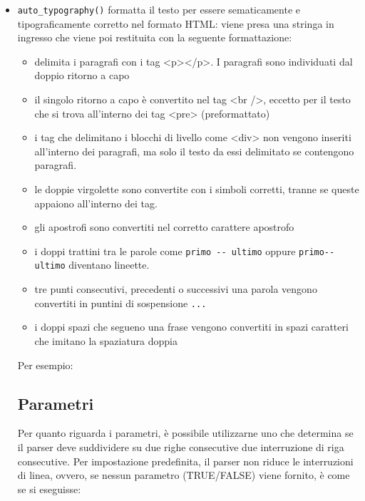 \begin{itemize}
\item \verb|auto_typography()| formatta il testo per essere sematicamente e tipograficamente corretto nel formato HTML: viene presa una stringa in ingresso che viene poi restituita con la seguente formattazione:

\begin{itemize}
\item delimita i paragrafi con i tag <p></p>. I paragrafi sono individuati dal doppio ritorno a capo
\item il singolo ritorno a capo è convertito nel tag <br />, eccetto per il testo che si trova all'interno dei tag <pre> (preformattato)
\item i tag che delimitano i blocchi di livello come <div> non vengono inseriti all'interno dei paragrafi, ma solo il testo da essi delimitato se contengono paragrafi.
\item le doppie virgolette sono convertite con i simboli corretti, tranne se queste appaiono all'interno dei tag.
\item gli apostrofi sono convertiti nel corretto carattere apostrofo
\item i doppi trattini tra le parole come \verb|primo -- ultimo| oppure \verb|primo--ultimo| diventano lineette.
\item tre punti consecutivi, precedenti o successivi una parola vengono convertiti in puntini di sospensione \verb|...|
\item i doppi spazi che segueno una frase vengono convertiti in spazi caratteri che imitano la spaziatura doppia
\end{itemize}

Per esempio:


\subsection*{Parametri}

Per quanto riguarda i parametri, è possibile utilizzarne uno che determina se il parser deve suddividere su due righe consecutive due interruzione di riga consecutive. Per impostazione predefinita, il parser non riduce le interruzioni di linea, ovvero, se nessun parametro (TRUE/FALSE) viene fornito, è come se si eseguisse:


\end{itemize}
